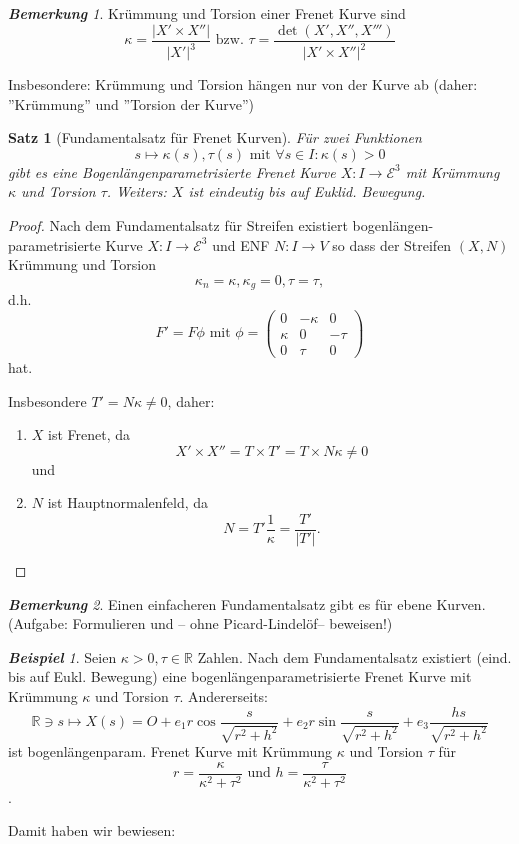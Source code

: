 \documentclass[a4paper,oneside,11pt,DIV=12,parskip=half]{scrartcl}
\newcommand{\R}{\mathbb R}
\newcommand{\E}{\mathcal E}
\theoremstyle{plain}
\newtheorem{theorem}{Satz}[section]
\theoremstyle{definition}
\newtheorem{remark, definition}[theorem]{Bemerkung und Definition.}
\newtheorem{lemma, definition}[theorem]{Lemma und Definition.}
\theoremstyle{remark}
\newtheorem*{remark}{\textbf{Bemerkung}}
\newtheorem*{example}{\textbf{Beispiel}}
\newtheorem*{remark, example}{\textbf{Bemerkung und Beispiel}}
\begin{document}
\begin{remark}
	Krümmung und Torsion einer Frenet Kurve sind \[ \kappa = \frac{|X' \times X''|}{|X'|^3} \text{ bzw. }  \tau = \frac{\det(X',X'',X''')}{|X' \times X''|^2} \]
	
	Insbesondere: Krümmung und Torsion hängen nur von der Kurve ab (daher: ''Krümmung'' und ''Torsion der Kurve'')
\end{remark}

\begin{theorem}[Fundamentalsatz für Frenet Kurven]
	Für zwei Funktionen \[ s \mapsto \kappa(s), \tau(s) \text{ mit } \forall s \in I: \kappa(s) > 0 \] gibt es eine Bogenlängenparametrisierte Frenet Kurve $X: I \rightarrow \E ^3$ mit Krümmung $\kappa$ und Torsion $\tau$. 
	Weiters: $X$ ist eindeutig bis auf Euklid. Bewegung.
\end{theorem}

\begin{proof}
	Nach dem Fundamentalsatz für Streifen existiert bogenlängen-parametrisierte Kurve $X: I \rightarrow \E^3$ und ENF $N: I \rightarrow V$ so dass der Streifen $ (X,N)$ Krümmung und Torsion \[  \kappa_n = \kappa, \kappa_g = 0, \tau = \tau,  \] d.h.\[F' = F\phi \text{ mit } \phi = \begin{pmatrix}
	0 & - \kappa & 0\\
\kappa & 0 & - \tau \\
0 & \tau & 0
	\end{pmatrix} \] hat.
	
	Insbesondere $T' = N\kappa \not = 0$, daher:
	\begin{enumerate}
	\item $X$ ist Frenet, da
	\[ X' \times X'' = T \times T' = T \times N\kappa \not = 0 \]
	und \item  $N$ ist Hauptnormalenfeld, da \[ N = T'\frac{1}{\kappa} = \frac{T'}{|T'|}. \]
	
	\end{enumerate}
\end{proof}

\begin{remark}
	Einen einfacheren Fundamentalsatz gibt es für ebene Kurven. (Aufgabe: Formulieren und -- ohne Picard-Lindelöf-- beweisen!)
\end{remark}

\begin{example}
	Seien $\kappa > 0, \tau \in \R$ Zahlen. Nach dem Fundamentalsatz existiert (eind. bis auf Eukl. Bewegung) eine bogenlängenparametrisierte Frenet Kurve mit Krümmung $\kappa$ und Torsion $\tau$. Andererseits: \[ \R \ni s \mapsto X(s) = O + e_1 r \cos \frac{s}{\sqrt{r^2+h^2}} + e_2 r \sin \frac{s}{\sqrt{r^2+h^2}} + e_3 \frac{hs}{\sqrt{r^2 + h^2}}\] ist bogenlängenparam. Frenet Kurve mit Krümmung $\kappa$ und Torsion $\tau$ für \[ r= \frac{\kappa}{\kappa^2 + \tau^2} \text{ und } h = \frac{ \tau}{\kappa^2 + \tau^2} \].
	
	Damit haben wir bewiesen:
\end{example}
\end{document}
